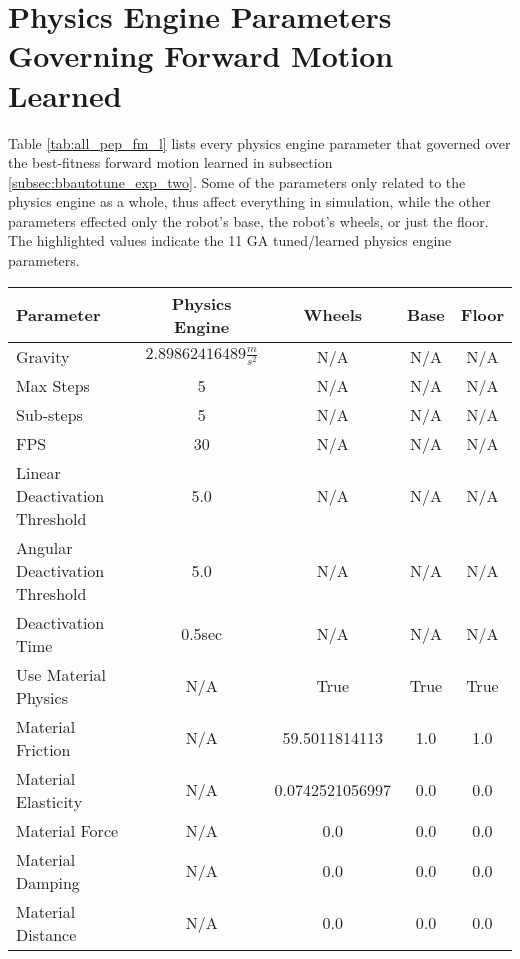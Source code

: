 
\chapter{Physics Engine Parameters Governing Forward Motion Learned}

\label{AppendixA}

Table \ref{tab:all_pep_fm_l} lists every physics engine parameter that governed over the best-fitness forward motion learned in subsection \ref{subsec:bbautotune_exp_two}. Some of the parameters only related to the physics engine as a whole, thus affect everything in simulation, while the other parameters effected only the robot's base, the robot's wheels, or just the floor. The highlighted values indicate the 11 GA tuned/learned physics engine parameters.

\begin{table}[htbp]
\centering
\footnotesize
\def\arraystretch{1.1}
\begin{tabular}{ | l || c | c | c | c | }
\hline
\rowcolor{gray}
Parameter & Physics Engine     & Wheels & Base & Floor     \\ \hline
Gravity   & \cellcolor{cyan} $2.89862416489\frac{m}{s^2}$ & N/A    & N/A  & N/A       \\ \hline
Max Steps & 5  & N/A & N/A & N/A \\ \hline
Sub-steps & \cellcolor{cyan} 5  & N/A & N/A & N/A \\ \hline
FPS       & \cellcolor{cyan} 30 & N/A & N/A & N/A \\ \hline
Linear Deactivation Threshold  & 5.0    & N/A & N/A & N/A \\ \hline
Angular Deactivation Threshold & 5.0    & N/A & N/A & N/A \\ \hline
Deactivation Time              & 0.5sec & N/A & N/A & N/A \\ \hline \hline
Use Material Physics       & N/A & True            & True & True \\ \hline
Material Friction          & N/A & \cellcolor{cyan} 59.5011814113   & 1.0  & 1.0 \\ \hline
Material Elasticity        & N/A & \cellcolor{cyan} 0.0742521056997 & 0.0  & 0.0 \\ \hline
Material Force             & N/A & 0.0                              & 0.0  & 0.0 \\ \hline
Material Damping           & N/A & 0.0                              & 0.0  & 0.0 \\ \hline
Material Distance          & N/A & 0.0                              & 0.0  & 0.0 \\ \hline

\end{tabular}
\end{table}
